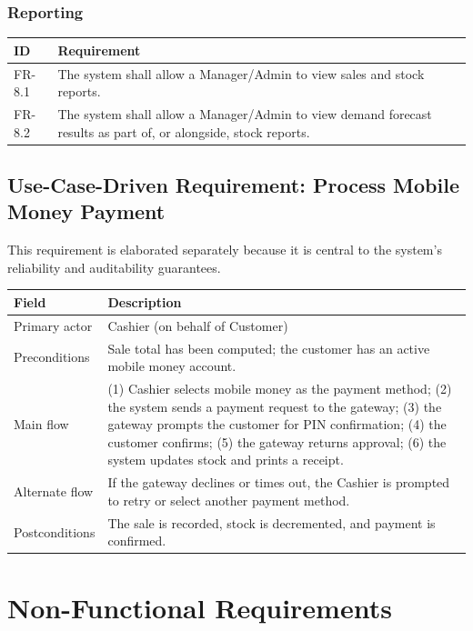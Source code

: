 \documentclass[11pt,a4paper]{report}
\begin{document}
\subsection{Reporting}
\begin{longtable}{p{1.6cm} L{11.4cm}}
\toprule
\textbf{ID} & \textbf{Requirement} \\
\midrule
\endhead
FR-8.1 & The system shall allow a Manager/Admin to view sales and stock reports. \\
FR-8.2 & The system shall allow a Manager/Admin to view demand forecast results as part of, or alongside, stock reports. \\
\bottomrule
\end{longtable}

\section{Use-Case-Driven Requirement: Process Mobile Money Payment}
This requirement is elaborated separately because it is central to the system's reliability and auditability guarantees.

\begin{longtable}{L{3.3cm} L{10.7cm}}
\toprule
\textbf{Field} & \textbf{Description} \\
\midrule
\endhead
Primary actor & Cashier (on behalf of Customer) \\
Preconditions & Sale total has been computed; the customer has an active mobile money account. \\
Main flow & (1) Cashier selects mobile money as the payment method; (2) the system sends a payment request to the gateway; (3) the gateway prompts the customer for PIN confirmation; (4) the customer confirms; (5) the gateway returns approval; (6) the system updates stock and prints a receipt. \\
Alternate flow & If the gateway declines or times out, the Cashier is prompted to retry or select another payment method. \\
Postconditions & The sale is recorded, stock is decremented, and payment is confirmed. \\
\bottomrule
\end{longtable}

\chapter{Non-Functional Requirements}
\end{document}
